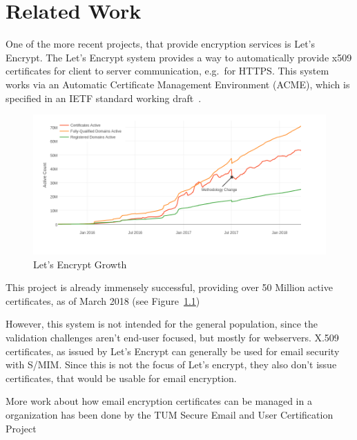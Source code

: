 \chapter{Related Work}\label{ch:relatedWork}
One of the more recent projects, that provide encryption services is Let's Encrypt.
The Let's Encrypt system provides a way to automatically provide x509 certificates for client to server communication,
e.g.\ for HTTPS\@.
This system works via an Automatic Certificate Management Environment (ACME), which is specified in an IETF standard
working draft~\cite{letsencrypteacme}.

\begin{figure}
    \centering
    \includegraphics[width=\textwidth]{figures/letsencryptusers.png}
    \caption{Let's Encrypt Growth~\cite{letsencryptstats}}
    \label{fig:letsencrypt}
\end{figure}

This project is already immensely successful, providing over 50 Million active certificates, as of March 2018 (see
Figure~\ref{fig:letsencrypt})

However, this system is not intended for the general population, since the validation challenges aren't end-user
focused, but mostly for webservers.
X.509 certificates, as issued by Let's Encrypt can generally be used for email security with S/MIM\@.
Since this is not the focus of Let's encrypt, they also don't issue certificates, that would be usable for email
encryption.

More work about how email encryption certificates can be managed in a organization has been done by the TUM Secure
Email and User Certification Project~\cite{hauner2016interoperability, jagdish2016certservice, straub2016directoryservice, maier2015multidevice}
